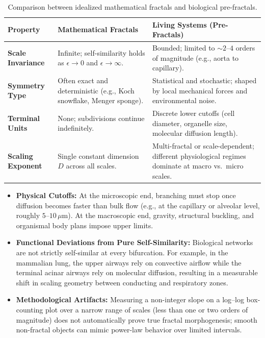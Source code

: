 \documentclass[12pt, letterpaper]{article}
\begin{document}
\begin{table}[H]
\centering
\renewcommand{\arraystretch}{1.35}
\begin{tabularx}{\textwidth}{p{3.4cm} p{4.6cm} X}
\toprule
\textbf{Property} & \textbf{Mathematical Fractals} & \textbf{Living Systems (Pre-Fractals)} \\
\midrule
\textbf{Scale Invariance} & Infinite; self-similarity holds as $\epsilon \to 0$ and $\epsilon \to \infty$. & Bounded; limited to $\sim 2\text{--}4$ orders of magnitude (e.g., aorta to capillary). \\
\textbf{Symmetry Type} & Often exact and deterministic (e.g., Koch snowflake, Menger sponge). & Statistical and stochastic; shaped by local mechanical forces and environmental noise. \\
\textbf{Terminal Units} & None; subdivisions continue indefinitely. & Discrete lower cutoffs (cell diameter, organelle size, molecular diffusion length). \\
\textbf{Scaling Exponent} & Single constant dimension $D$ across all scales. & Multi-fractal or scale-dependent; different physiological regimes dominate at macro vs.\ micro scales. \\
\bottomrule
\end{tabularx}
\caption{Comparison between idealized mathematical fractals and biological pre-fractals.}
\label{tab:fractal_comparison}
\end{table}

\begin{itemize}
    \item \textbf{Physical Cutoffs:} At the microscopic end, branching must stop once diffusion becomes faster than bulk flow (e.g., at the capillary or alveolar level, roughly $5\text{--}10\,\mu\text{m}$). At the macroscopic end, gravity, structural buckling, and organismal body plans impose upper limits.
    \item \textbf{Functional Deviations from Pure Self-Similarity:} Biological networks are not strictly self-similar at every bifurcation. For example, in the mammalian lung, the upper airways rely on convective airflow while the terminal acinar airways rely on molecular diffusion, resulting in a measurable shift in scaling geometry between conducting and respiratory zones.
    \item \textbf{Methodological Artifacts:} Measuring a non-integer slope on a log--log box-counting plot over a narrow range of scales (less than one or two orders of magnitude) does not automatically prove true fractal morphogenesis; smooth non-fractal objects can mimic power-law behavior over limited intervals.
\end{itemize}
\end{document}

